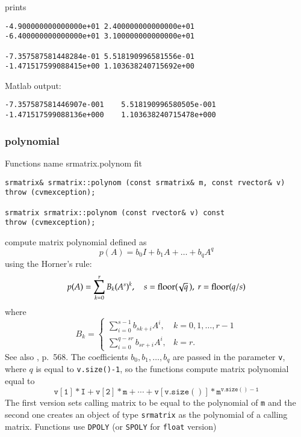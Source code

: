 prints
\begin{Verbatim}
-4.900000000000000e+01 2.400000000000000e+01
-6.400000000000000e+01 3.100000000000000e+01

-7.357587581448284e-01 5.518190996581556e-01
-1.471517599088415e+00 1.103638240715692e+00
\end{Verbatim}
Matlab output:
\begin{Verbatim}
-7.357587581446907e-001    5.518190996580505e-001
-1.471517599088136e+000    1.103638240715478e+000
\end{Verbatim}
\newpage





\subsubsection{polynomial}
Functions%
\pdfdest name {srmatrix.polynom} fit
\begin{verbatim}
srmatrix& srmatrix::polynom (const srmatrix& m, const rvector& v)
throw (cvmexception);

srmatrix srmatrix::polynom (const rvector& v) const
throw (cvmexception);
\end{verbatim}
compute  matrix polynomial defined as
\begin{equation*}
p(A)=b_0I+b_1A+\dots+b_qA^q
\end{equation*}
using the Horner's rule:
\begin{equation*}
p(A)=\sum_{k=0}^r B_k(A^s)^k,\quad s=\operatorname{floor}(\!\sqrt{q}\,),\ r=\operatorname{floor}(q/s)
\end{equation*}
where
\begin{equation*}
B_k=\begin{cases}
\sum\limits_{i=0}^{s-1}b_{sk+i} A^i, & k=0,1,\dots,r-1\\
\sum\limits_{i=0}^{q-sr}b_{sr+i} A^i, & k=r.
\end{cases}
\end{equation*}
See also , p.~568.
The coefficients $b_0,b_1,\dots,b_q$ are passed in the parameter 
\verb"v",
where $q$ is equal to \verb"v.size()-1", so the functions
compute matrix polynomial equal to
\begin{equation*}
\mathtt{v[1]*I + v[2]*m +\cdots + v[v.size()]*m^{v.size()-1}}
\end{equation*}
The first version sets  calling matrix to be equal to the polynomial of
\verb"m"
and the second one
creates an object of type \verb"srmatrix" as the 
polynomial of a calling matrix.
Functions use \verb"DPOLY" (or \verb"SPOLY" for \verb"float" version)
